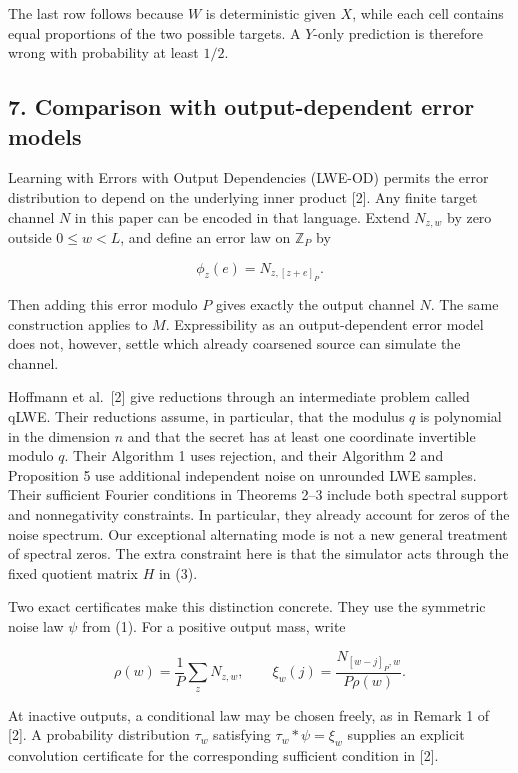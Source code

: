 \documentclass[
]{article}
\begin{document}
The last row follows because \(W\) is deterministic given \(X\), while
each cell contains equal proportions of the two possible targets. A
\(Y\)-only prediction is therefore wrong with probability at least
\(1/2\).

\subsection{7. Comparison with output-dependent error
models}\label{comparison-with-output-dependent-error-models}

Learning with Errors with Output Dependencies (LWE-OD) permits the error
distribution to depend on the underlying inner product {[}2{]}. Any
finite target channel \(N\) in this paper can be encoded in that
language. Extend \(N_{z,w}\) by zero outside \(0\le w<L\), and define an
error law on \(\mathbb Z_P\) by

\[
\phi_z(e)=N_{z,[z+e]_P}.
\tag{8}
\]

Then adding this error modulo \(P\) gives exactly the output channel
\(N\). The same construction applies to \(M\). Expressibility as an
output-dependent error model does not, however, settle which already
coarsened source can simulate the channel.

Hoffmann et al.~{[}2{]} give reductions through an intermediate problem
called qLWE. Their reductions assume, in particular, that the modulus
\(q\) is polynomial in the dimension \(n\) and that the secret has at
least one coordinate invertible modulo \(q\). Their Algorithm 1 uses
rejection, and their Algorithm 2 and Proposition 5 use additional
independent noise on unrounded LWE samples. Their sufficient Fourier
conditions in Theorems 2--3 include both spectral support and
nonnegativity constraints. In particular, they already account for zeros
of the noise spectrum. Our exceptional alternating mode is not a new
general treatment of spectral zeros. The extra constraint here is that
the simulator acts through the fixed quotient matrix \(H\) in (3).

Two exact certificates make this distinction concrete. They use the
symmetric noise law \(\psi\) from (1). For a positive output mass, write

\[
\rho(w)=\frac1P\sum_zN_{z,w},\qquad
\xi_w(j)=\frac{N_{[w-j]_P,w}}{P\rho(w)}.
\tag{9}
\]

At inactive outputs, a conditional law may be chosen freely, as in
Remark 1 of {[}2{]}. A probability distribution \(\tau_w\) satisfying
\(\tau_w*\psi=\xi_w\) supplies an explicit convolution certificate for
the corresponding sufficient condition in {[}2{]}.
\end{document}
